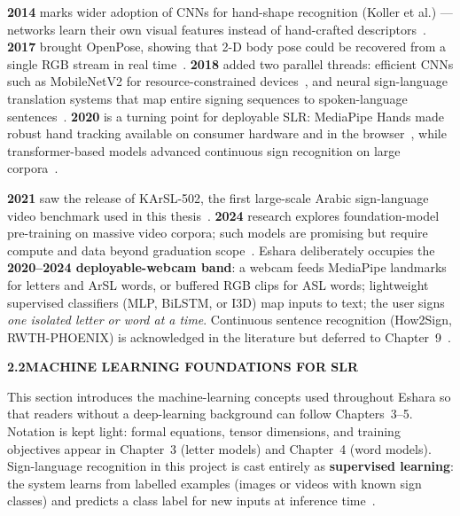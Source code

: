 \noindent \textbf{2014} marks wider adoption of CNNs for hand-shape recognition (Koller et al.) --- networks learn their own visual features instead of hand-crafted descriptors~\cite{koller2016continuous}. \textbf{2017} brought OpenPose, showing that 2-D body pose could be recovered from a single RGB stream in real time~\cite{cao2019openpose}. \textbf{2018} added two parallel threads: efficient CNNs such as MobileNetV2 for resource-constrained devices~\cite{sandler2018mobilenetv2}, and neural sign-language translation systems that map entire signing sequences to spoken-language sentences~\cite{camgoz2018neural}. \textbf{2020} is a turning point for deployable SLR: MediaPipe Hands made robust hand tracking available on consumer hardware and in the browser~\cite{zhang2020mediapipe,mediapipeweb}, while transformer-based models advanced continuous sign recognition on large corpora~\cite{vaswani2017attention,koller2020weakly}.\par\vspace{0.2cm}

\noindent \textbf{2021} saw the release of KArSL-502, the first large-scale Arabic sign-language video benchmark used in this thesis~\cite{sidig2021karsl}. \textbf{2024} research explores foundation-model pre-training on massive video corpora; such models are promising but require compute and data beyond graduation scope~\cite{adaloglou2022comprehensive}. Eshara deliberately occupies the \textbf{2020--2024 deployable-webcam band}: a webcam feeds MediaPipe landmarks for letters and ArSL words, or buffered RGB clips for ASL words; lightweight supervised classifiers (MLP, BiLSTM, or I3D) map inputs to text; the user signs \emph{one isolated letter or word at a time}. Continuous sentence recognition (How2Sign, RWTH-PHOENIX) is acknowledged in the literature but deferred to Chapter~9~\cite{duarte2021how2sign,forster2014rwth}.\par\vspace{0.3cm}

\noindent\textbf{2.2\quad MACHINE LEARNING FOUNDATIONS FOR SLR}\par
{}
\vspace{0.2cm}

\noindent This section introduces the machine-learning concepts used throughout Eshara so that readers without a deep-learning background can follow Chapters~3--5. Notation is kept light: formal equations, tensor dimensions, and training objectives appear in Chapter~3 (letter models) and Chapter~4 (word models). Sign-language recognition in this project is cast entirely as \textbf{supervised learning}: the system learns from labelled examples (images or videos with known sign classes) and predicts a class label for new inputs at inference time~\cite{rastgoo2021survey}.\par\vspace{0.2cm}

